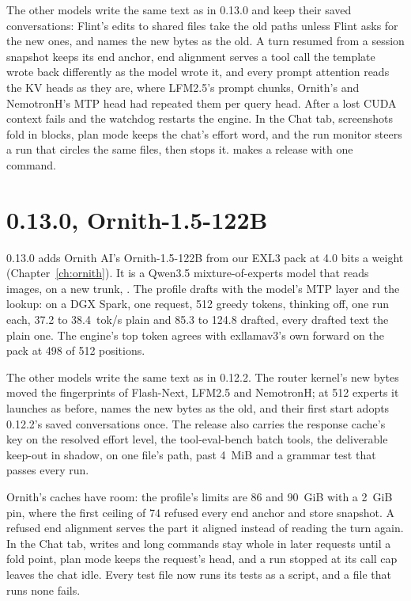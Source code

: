 The other models write the same text as in 0.13.0 and keep their saved conversations: Flint's edits to shared files take the old paths unless Flint asks for the new ones, and  names the new bytes as the old. A turn resumed from a session snapshot keeps its end anchor, end alignment serves a tool call the template wrote back differently as the model wrote it, and every prompt attention reads the KV heads as they are, where LFM2.5's prompt chunks, Ornith's and NemotronH's MTP head had repeated them per query head. After a lost CUDA context  fails and the watchdog restarts the engine. In the Chat tab, screenshots fold in blocks, plan mode keeps the chat's effort word, and the run monitor steers a run that circles the same files, then stops it.  makes a release with one command.

\section{0.13.0, Ornith-1.5-122B}\label{sec:changelog-0130}

0.13.0 adds Ornith AI's Ornith-1.5-122B from our EXL3 pack at 4.0 bits a weight (Chapter~\ref{ch:ornith}). It is a Qwen3.5 mixture-of-experts model that reads images, on a new trunk, . The profile drafts with the model's MTP layer and the lookup: on a DGX Spark, one request, 512 greedy tokens, thinking off, one run each, 37.2 to 38.4~tok/s plain and 85.3 to 124.8 drafted, every drafted text the plain one. The engine's top token agrees with exllamav3's own forward on the pack at 498 of 512 positions.

The other models write the same text as in 0.12.2. The router kernel's new bytes moved the fingerprints of Flash-Next, LFM2.5 and NemotronH; at 512 experts it launches as before,  names the new bytes as the old, and their first start adopts 0.12.2's saved conversations once. The release also carries the response cache's key on the resolved effort level, the tool-eval-bench batch tools, the deliverable keep-out in shadow,  on one file's path,  past 4~MiB and a grammar test that passes every run.

Ornith's caches have room: the profile's limits are 86 and 90~GiB with a 2~GiB pin, where the first ceiling of 74 refused every end anchor and store snapshot. A refused end alignment serves the part it aligned instead of reading the turn again. In the Chat tab, writes and long commands stay whole in later requests until a fold point, plan mode keeps the request's head, and a run stopped at its call cap leaves the chat idle. Every test file now runs its tests as a script, and a file that runs none fails.

